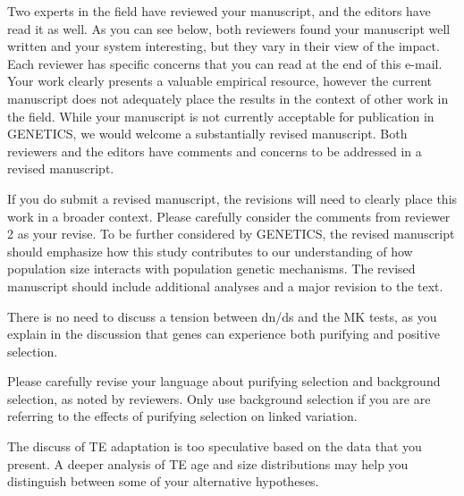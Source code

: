 \begin{itquote}
Two experts in the field have reviewed your manuscript, and the editors
have read it as well. As you can see below, both reviewers found your
manuscript well written and your system interesting, but they vary in
their view of the impact. Each reviewer has specific concerns that you
can read at the end of this e-mail. Your work clearly presents a valuable
empirical resource, however the current manuscript does not adequately
place the results in the context of other work in the field. While your
manuscript is not currently acceptable for publication in GENETICS, we
would welcome a substantially revised manuscript. Both reviewers and the
editors have comments and concerns to be addressed in a revised
manuscript.

If you do submit a revised manuscript, the revisions will need to clearly
place this work in a broader context. Please carefully consider the
comments from reviewer 2 as your revise. To be further considered by
GENETICS, the revised manuscript should emphasize how this study
contributes to our understanding of how population size interacts with
population genetic mechanisms. The revised manuscript should include
additional analyses and a major revision to the text.
\end{itquote}


\begin{point}{} %
There is no need to discuss a tension between dn/ds and the MK tests, as
you explain in the discussion that genes can experience both purifying
and positive selection.
\end{point}


\begin{point}{} %
Please carefully revise your language about purifying selection and
background selection, as noted by reviewers. Only use background
selection if you are are referring to the effects of purifying selection
on linked variation.
\end{point}


\begin{point}{} %
The discuss of TE adaptation is too speculative based on the data that
you present. A deeper analysis of TE age and size distributions may help
you distinguish between some of your alternative hypotheses.
\end{point}

